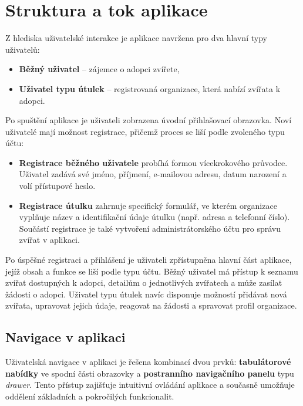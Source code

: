 \documentclass[czech, bp, kiv, he, iso690numb, pdf]{fasthesis}
\begin{document}
    \section{Struktura a tok aplikace}

    Z hlediska uživatelské interakce je aplikace navržena pro dva hlavní typy uživatelů:

    \begin{itemize}
        \item \textbf{Běžný uživatel} – zájemce o adopci zvířete,
        \item \textbf{Uživatel typu útulek} – registrovaná organizace, která nabízí zvířata k adopci.
    \end{itemize}

    \noindent Po spuštění aplikace je uživateli zobrazena úvodní přihlašovací obrazovka. Noví uživatelé mají možnost registrace, přičemž proces se liší podle zvoleného typu účtu:

    \begin{itemize}
        \item \textbf{Registrace běžného uživatele} probíhá formou vícekrokového průvodce. Uživatel zadává své jméno, příjmení, e-mailovou adresu, datum narození a volí přístupové heslo.

        \item \textbf{Registrace útulku} zahrnuje specifický formulář, ve kterém organizace vyplňuje název a identifikační údaje útulku (např. adresa a telefonní číslo). Součástí registrace je také vytvoření administrátorského účtu pro správu zvířat v aplikaci.
    \end{itemize}

    \noindent Po úspěšné registraci a přihlášení je uživateli zpřístupněna hlavní část aplikace, jejíž obsah a funkce se liší podle typu účtu. Běžný uživatel má přístup k seznamu zvířat dostupných k adopci, detailům o jednotlivých zvířatech a může zasílat žádosti o adopci. Uživatel typu útulek navíc disponuje možností přidávat nová zvířata, upravovat jejich údaje, reagovat na žádosti a spravovat profil organizace.

    \subsection{Navigace v aplikaci}

    Uživatelská navigace v aplikaci je řešena kombinací dvou prvků: \textbf{tabulátorové nabídky} ve spodní části obrazovky a \textbf{postranního navigačního panelu} typu \textit{drawer}. Tento přístup zajišťuje intuitivní ovládání aplikace a současně umožňuje oddělení základních a pokročilých funkcionalit.
\end{document}
